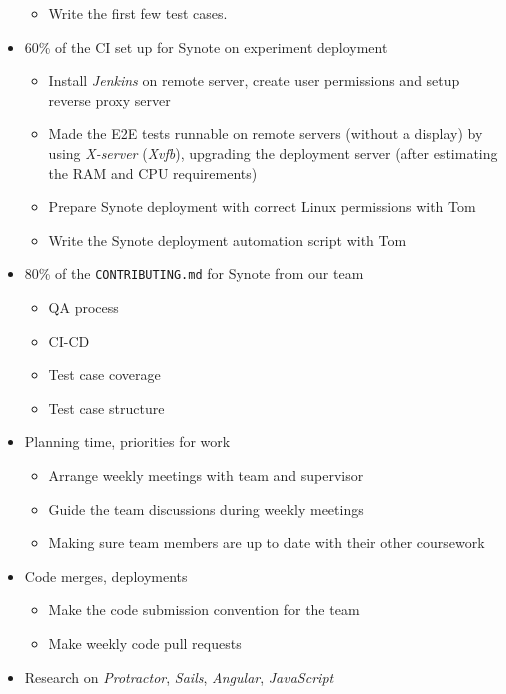 \begin{itemize}
\begin{itemize}
  \item Write the first few test cases.
 \end{itemize}
 \item 60\% of the CI set up for Synote on experiment deployment
 \begin{itemize}
  \item Install \textit{Jenkins} on remote server, create user permissions and setup reverse proxy server
  \item Made the E2E tests runnable on remote servers (without a display) by using \textit{X-server} (\textit{Xvfb}), upgrading the deployment server (after estimating the RAM and CPU requirements)
  \item Prepare Synote deployment with correct Linux permissions with Tom
  \item Write the Synote deployment automation script with Tom
 \end{itemize}
 \item 80\% of the \texttt{CONTRIBUTING.md} for Synote from our team
 \begin{itemize}
  \item QA process
  \item CI-CD
  \item Test case coverage
  \item Test case structure
 \end{itemize}
 \item Planning time, priorities for work
 \begin{itemize}
  \item Arrange weekly meetings with team and supervisor
  \item Guide the team discussions during weekly meetings
  \item Making sure team members are up to date with their other coursework
 \end{itemize}
 \item Code merges, deployments
 \begin{itemize}
  \item Make the code submission convention for the team
  \item Make weekly code pull requests
 \end{itemize}
 \item Research on \textit{Protractor}, \textit{Sails}, \textit{Angular}, \textit{JavaScript}
\end{itemize}
